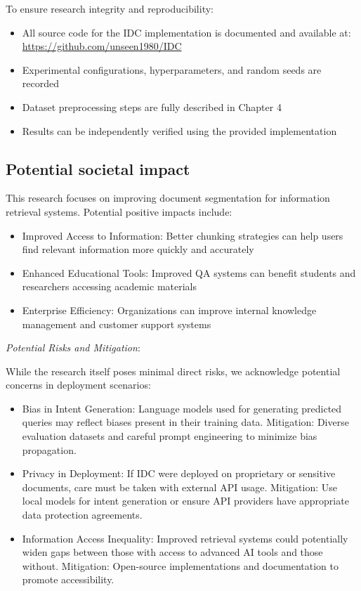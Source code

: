 \documentclass[12pt,a4paper]{report}
\begin{document}
To ensure research integrity and reproducibility:

\begin{itemize}
\item All source code for the IDC implementation is documented and available at: \url{https://github.com/unseen1980/IDC}
\item Experimental configurations, hyperparameters, and random seeds are recorded
\item Dataset preprocessing steps are fully described in Chapter 4
\item Results can be independently verified using the provided implementation
\end{itemize}

\subsection{Potential societal impact}

This research focuses on improving document segmentation for information retrieval systems. Potential positive impacts include:

\begin{itemize}
\item Improved Access to Information: Better chunking strategies can help users find relevant information more quickly and accurately
\item Enhanced Educational Tools: Improved QA systems can benefit students and researchers accessing academic materials
\item Enterprise Efficiency: Organizations can improve internal knowledge management and customer support systems
\end{itemize}

\emph{Potential Risks and Mitigation}:

While the research itself poses minimal direct risks, we acknowledge potential concerns in deployment scenarios:

\begin{itemize}
\item Bias in Intent Generation: Language models used for generating predicted queries may reflect biases present in their training data. Mitigation: Diverse evaluation datasets and careful prompt engineering to minimize bias propagation.

\item Privacy in Deployment: If IDC were deployed on proprietary or sensitive documents, care must be taken with external API usage. Mitigation: Use local models for intent generation or ensure API providers have appropriate data protection agreements.

\item Information Access Inequality: Improved retrieval systems could potentially widen gaps between those with access to advanced AI tools and those without. Mitigation: Open-source implementations and documentation to promote accessibility.
\end{itemize}
\end{document}
